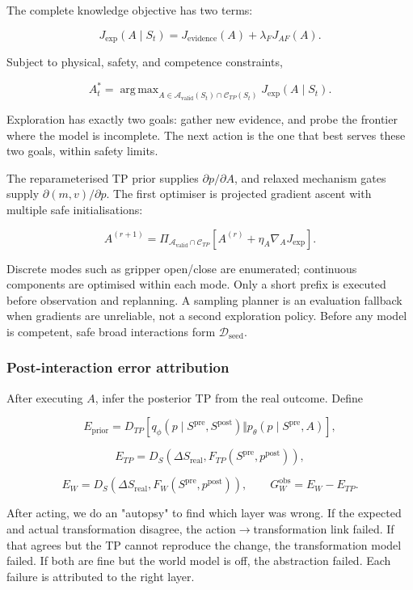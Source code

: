 \documentclass[11pt]{article}
\DeclareMathOperator*{\argmax}{arg\,max}
\newenvironment{plainword}{%
  \par\medskip\noindent\begin{minipage}{\textwidth}%
  \color{gray!75!black}\small\itshape
}{%
  \end{minipage}\par\medskip}
\begin{document}
The complete knowledge objective has two terms:

\[
\boxed{J_{\mathrm{exp}}(A\mid S_t)=
J_{\mathrm{evidence}}(A)+\lambda_FJ_{AF}(A).}
\]

Subject to physical, safety, and competence constraints,

\[
\boxed{
A_t^*=\argmax_{A\in\mathcal A_{\mathrm{valid}}(S_t)\cap\mathcal C_{TP}(S_t)}
J_{\mathrm{exp}}(A\mid S_t).}
\]

\begin{plainword}
Exploration has exactly two goals: gather new evidence, and probe the frontier where the model is incomplete. The next action is the
one that best serves these two goals, within safety limits.
\end{plainword}

The reparameterised TP prior supplies $\partial p/\partial A$, and relaxed mechanism gates supply $\partial(m,v)/\partial p$. The
first optimiser is projected gradient ascent with multiple safe initialisations:

\[
\boxed{
A^{(r+1)}=
\Pi_{\mathcal A_{\mathrm{valid}}\cap\mathcal C_{TP}}
\left[A^{(r)}+\eta_A\nabla_AJ_{\mathrm{exp}}\right].}
\]

Discrete modes such as gripper open/close are enumerated; continuous components are optimised within each mode. Only a short prefix
is executed before observation and replanning. A sampling planner is an evaluation fallback when gradients are unreliable, not a
second exploration policy. Before any model is competent, safe broad interactions form $\mathcal D_{\mathrm{seed}}$.

\subsubsection*{Post-interaction error attribution}

After executing $A$, infer the posterior TP from the real outcome. Define

\[
\boxed{
E_{\mathrm{prior}}=
D_{TP}[q_\phi(p\mid S^{\mathrm{pre}},S^{\mathrm{post}})
\Vert p_\theta(p\mid S^{\mathrm{pre}},A)],}
\]

\[
\boxed{
E_{TP}=D_S(\Delta S_{\mathrm{real}},
F_{TP}(S^{\mathrm{pre}},p^{\mathrm{post}})),}
\]

\[
\boxed{
E_W=D_S(\Delta S_{\mathrm{real}},
F_W(S^{\mathrm{pre}},p^{\mathrm{post}})),
\qquad
G_W^{\mathrm{obs}}=E_W-E_{TP}.}
\]

\begin{plainword}
After acting, we do an "autopsy" to find which layer was wrong. If the expected and actual transformation disagree, the
action$\to$transformation link failed. If that agrees but the TP cannot reproduce the change, the transformation model failed. If
both are fine but the world model is off, the abstraction failed. Each failure is attributed to the right layer.
\end{plainword}
\end{document}
